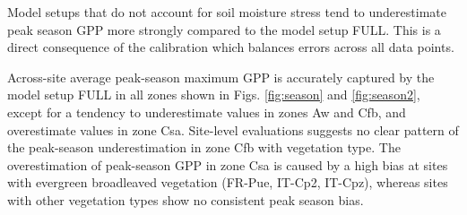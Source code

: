 \documentclass{myreport}
\begin{document}
Model setups that do not account for soil moisture stress tend to underestimate peak season GPP more strongly compared to the model setup FULL. This is a direct consequence of the calibration which balances errors across all data points.

Across-site average peak-season maximum GPP is accurately captured by the model setup FULL in all zones shown in Figs. \ref{fig:season} and \ref{fig:season2}, except for a tendency to underestimate values in zones Aw and Cfb, and overestimate values in zone Csa. Site-level evaluations suggests no clear pattern of the peak-season underestimation in zone Cfb with vegetation type. The overestimation of peak-season GPP in zone Csa is caused by a high bias at sites with evergreen broadleaved vegetation (FR-Pue, IT-Cp2, IT-Cpz), whereas sites with other vegetation types show no consistent peak season bias. 
\end{document}
